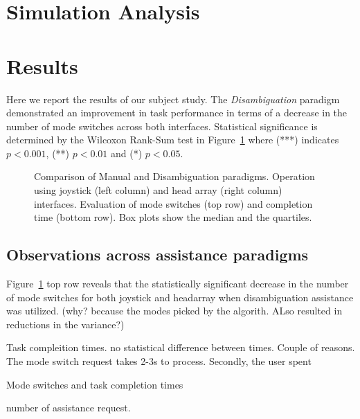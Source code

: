 \section{Simulation Analysis}
\section{Results}\label{sec:results}
Here we report the results of our subject study. The \textit{Disambiguation} paradigm demonstrated an improvement in task performance in terms of a decrease in the number of mode switches across both interfaces. Statistical significance is determined by the Wilcoxon Rank-Sum test in Figure~\ref{fig:man_disamb} where (***) indicates $p < 0.001$, (**) $p < 0.01$ and (*) $p < 0.05$.
\begin{figure}[t]
	\centering
	\caption{Comparison of Manual and Disambiguation paradigms. Operation using joystick (left column) and head array (right column) interfaces. Evaluation of mode switches (top row) and completion time (bottom row). Box plots show the median and the quartiles.}
	\label{fig:man_disamb}
\end{figure}

\subsection{Observations across assistance paradigms}
Figure~\ref{fig:man_disamb} top row reveals that the statistically significant decrease in the number of mode switches for both joystick and headarray when disambiguation assistance was utilized.
(why? because the modes picked by the algorith. ALso resulted in reductions in the variance?)

Task compleition times. no statistical difference between times. 
Couple of reasons. The mode switch request takes 2-3s to process. Secondly, the user spent
 
Mode switches and task completion times

number of assistance request. 


